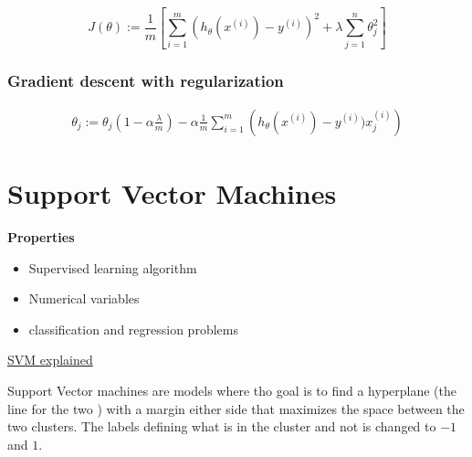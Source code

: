 \begin{multicols}{2}
\begin{equation*}
    J(\theta) := \frac{1}{m}\left[\sum_{i=1}^m (h_{\theta}(x^{(i)}) - y^{(i)})^2 + \lambda\sum_{j=1}^n \theta_j^2\right]
\end{equation*}

\subsubsection{Gradient descent with regularization}
\begin{align*}
    \theta_j := \theta_j\left(1-\alpha\frac{\lambda}{m}\right) - \alpha\frac{1}{m}\sum_{i=1}^m \left(h_{\theta}(x^{(i)}) - y^{(i)})x_j^{(i)}\right)
\end{align*}



\section{Support Vector Machines}
\textbf{Properties}
\begin{itemize}
    \item Supervised learning algorithm
    \item Numerical variables 
    \item classification and regression problems
\end{itemize}
\href{https://www.youtube.com/watch?v=efR1C6CvhmE}{SVM explained}

Support Vector machines are models where tho goal is to find a hyperplane (the line for the two ) with a 
margin either side that maximizes the space between the two clusters.
The labels defining what is in the cluster and not is changed to $-1$ and $1$.


\end{multicols}
